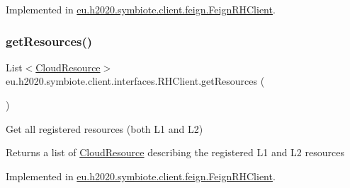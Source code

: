 Implemented in \hyperlink{classeu_1_1h2020_1_1symbiote_1_1client_1_1feign_1_1FeignRHClient_afeca18b59c770a4ce9789f4d7cfd31ab}{eu.\+h2020.\+symbiote.\+client.\+feign.\+Feign\+R\+H\+Client}.

\mbox{\label{interfaceeu_1_1h2020_1_1symbiote_1_1client_1_1interfaces_1_1RHClient_a116bb408726cd3d423236c56bdd18af3}} 
\subsubsection{\texorpdfstring{get\+Resources()}{getResources()}}
{\footnotesize\ttfamily List$<$\hyperlink{classeu_1_1h2020_1_1symbiote_1_1cloud_1_1model_1_1internal_1_1CloudResource}{Cloud\+Resource}$>$ eu.\+h2020.\+symbiote.\+client.\+interfaces.\+R\+H\+Client.\+get\+Resources (\begin{DoxyParamCaption}{ }\end{DoxyParamCaption})}

Get all registered resources (both L1 and L2)

\begin{DoxyReturn}{Returns}
a list of \hyperlink{}{Cloud\+Resource} describing the registered L1 and L2 resources 
\end{DoxyReturn}


Implemented in \hyperlink{classeu_1_1h2020_1_1symbiote_1_1client_1_1feign_1_1FeignRHClient_a25d731190f6d9fd35552ec93a55f721c}{eu.\+h2020.\+symbiote.\+client.\+feign.\+Feign\+R\+H\+Client}.

\mbox{\label{interfaceeu_1_1h2020_1_1symbiote_1_1client_1_1interfaces_1_1RHClient_a8957be63f35e866513383cd20452a374}} 
